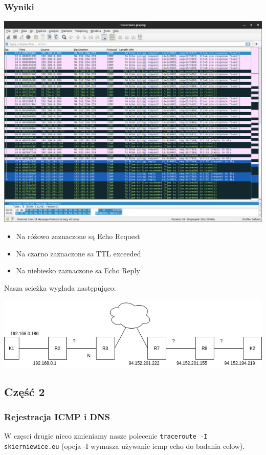 \documentclass[11pt]{article}
\begin{document}
\subsubsection{Wyniki}
\label{sec:org04591f3}
\begin{center}
\includegraphics[width=.9\linewidth]{./part1/traceroute.png}
\end{center}
\begin{itemize}
\item Na różowo zaznaczone są Echo Request
\item Na czarno zaznaczone sa TTL exceeded
\item Na niebiesko zaznaczone sa Echo Reply
\end{itemize}

Nasza scieżka wyglada następująco:
\begin{center}
\includegraphics[width=.9\linewidth]{./part1/part1.png}
\end{center}

\subsection{Część 2}
\label{sec:org34cd84e}
\subsubsection{Rejestracja ICMP i DNS}
\label{sec:orgdbc4dd2}
W częsci drugie nieco zmieniamy nasze polecenie \texttt{traceroute -I skierniewice.eu} (opcja -I wymusza używanie icmp echo do badania celow).
\end{document}

